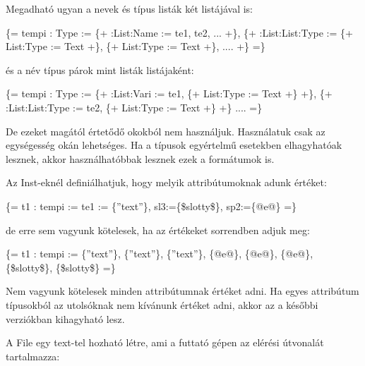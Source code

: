 Megadható ugyan a nevek és típus listák két listájával is:

\{= tempi : Type := \{+ :List:Name := te1, te2, ... +\}, \{+ :List:List:Type := \{+ List:Type := Text +\}, \{+ List:Type := Text +\}, .... +\} =\}

és a név típus párok mint listák listájaként:

\{= tempi : Type := \{+ :List:Vari := te1, \{+ List:Type := Text +\} +\}, \{+ :List:List:Type := te2, \{+ List:Type := Text +\} +\} .... =\}

De ezeket magától értetődő okokból nem használjuk.
Használatuk csak az egységesség okán lehetséges.
Ha a típusok egyértelmű esetekben elhagyhatóak lesznek, akkor használhatóbbak lesznek ezek a formátumok is.

Az Inst-eknél definiálhatjuk, hogy melyik attribútumoknak adunk értéket:

\{= t1 : tempi := te1 := \{”text”\}, sl3:=\{\$slotty\$\}, sp2:=\{@e@\} =\}

de erre sem vagyunk kötelesek, ha az értékeket sorrendben adjuk meg:

\{= t1 : tempi := \{”text”\}, \{”text”\}, \{”text”\}, \{@e@\}, \{@e@\}, \{@e@\}, \{\$slotty\$\}, \{\$slotty\$\} =\}

Nem vagyunk kötelesek minden attribútumnak értéket adni.
Ha egyes attribútum típusokból az utolsóknak nem kívánunk értéket adni, akkor az a későbbi verziókban kihagyható lesz.

A File egy text-tel hozható létre, ami a futtató gépen az elérési útvonalát tartalmazza:

